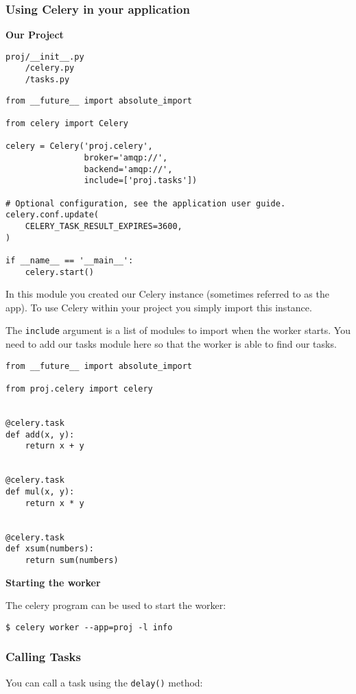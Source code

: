 \documentclass[9pt,a4paper]{article}
\begin{document}
\begin{CJK*}{GBK}{kai}
\subsubsection{Using Celery in your application}
\textbf{Our Project}

\begin{Verbatim}[frame=single]
proj/__init__.py
    /celery.py
    /tasks.py
\end{Verbatim}

\begin{Verbatim}[frame=single, label=proj/celery.py]
from __future__ import absolute_import

from celery import Celery

celery = Celery('proj.celery',
                broker='amqp://',
                backend='amqp://',
                include=['proj.tasks'])

# Optional configuration, see the application user guide.
celery.conf.update(
    CELERY_TASK_RESULT_EXPIRES=3600,
)

if __name__ == '__main__':
    celery.start()
\end{Verbatim}

In this module you created our Celery instance (sometimes referred to as the app). To use Celery within your project you simply import this instance.

The \verb"include" argument is a list of modules to import when the worker starts. You need to add our tasks module here so that the worker is able to find our tasks.

\begin{Verbatim}[frame=single, label=proj/tasks.py]
from __future__ import absolute_import

from proj.celery import celery


@celery.task
def add(x, y):
    return x + y


@celery.task
def mul(x, y):
    return x * y


@celery.task
def xsum(numbers):
    return sum(numbers)
\end{Verbatim}

\textbf{Starting the worker}

The celery program can be used to start the worker:

\begin{Verbatim}[frame=single]
$ celery worker --app=proj -l info
\end{Verbatim}

\subsubsection{Calling Tasks}
You can call a task using the \verb"delay()" method:


\end{CJK*}
\end{document}
